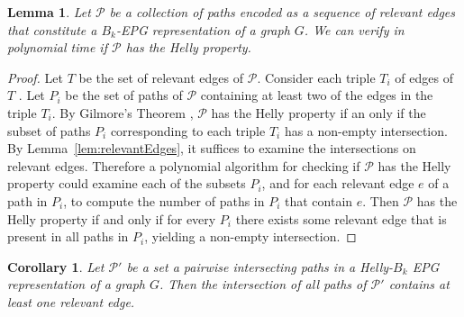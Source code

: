 \documentclass[
submission
]{dmtcs-episciences}
\newtheorem{lemma}[theorem]{Lemma}
\newtheorem{corollary}[theorem]{Corollary}
\begin{document}
\begin{lemma}\label{lem:verify3}
Let $\mathcal{P}$ be a collection of paths encoded as a sequence of relevant edges that constitute a  $B_k$-EPG representation of a graph $G$. We can verify in polynomial time if $\mathcal{P}$ has the Helly property.
\end{lemma}

\begin{proof}
Let $T$ be the set of relevant edges of $\mathcal{P}$. Consider each triple $T_i$ of edges of $T$ . Let $P_i$ be the set of paths of $\mathcal{P}$ containing at least two of the edges in the triple  $T_i$. By Gilmore's Theorem \cite{bergeDuchet1975}, $\mathcal{P}$ has the Helly property if an only if the subset of paths $P_i$  corresponding to each triple  $T_i$  has a non-empty intersection.  By Lemma~\ref{lem:relevantEdges}, it suffices to examine the intersections on relevant edges. Therefore a polynomial algorithm for checking if $\mathcal{P}$ has the Helly property could examine each of the subsets $P_i$, and for each relevant edge $e$ of a path in $P_i$, to compute the number of paths in $P_i$ that contain $e$. Then  $\mathcal{P}$ has the Helly property if and only if for every  $P_i$  there exists some relevant edge that is present in all paths in $P_i$,  yielding a non-empty intersection.
 \end{proof}


\begin{corollary}\label{cor:comumAtodos}
Let ${\mathcal P'}$ be a set a pairwise intersecting paths in a Helly-$B_k$ EPG representation of a graph $G$. Then the intersection of all paths of  ${\mathcal P'}$ contains at least one relevant edge.
\end{corollary}
\end{document}

